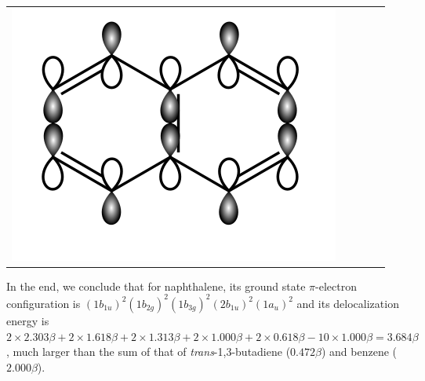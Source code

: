 \documentclass[a4paper]{book}
\begin{document}
\begin{solution}
\begin{enumerate}[label=(\alph*)]
\begin{center}
\begin{tabular}{ccccc}
\begin{minipage}[t]{0.175\linewidth}
			\includegraphics[scale=0.72]{./structures/exercise_1/naphthalene/4.png}\hspace*{-1.5em}
			\captionof*{figure}{$\varepsilon = \alpha - 2.303\beta$}
			\end{minipage}
		\end{tabular}				
		\label{fig:phase_diagram_5}
		\end{center}
		
		In the end, we conclude that for naphthalene, its ground state $\pi$-electron configuration is $(1b_{1u})^2 (1b_{2g})^2 (1b_{3g})^2 (2b_{1u})^2 (1a_u)^2$ and its delocalization energy is $2 \times 2.303 \beta + 2 \times 1.618 \beta + 2 \times 1.313 \beta + 2 \times 1.000 \beta + 2 \times 0.618 \beta - 10 \times 1.000 \beta = 3.684 \beta$, much larger than the sum of that of {\it trans}-1,3-butadiene ($0.472\beta$) and benzene ($2.000\beta$). 
		

\end{enumerate}
\end{solution}
\end{document}
